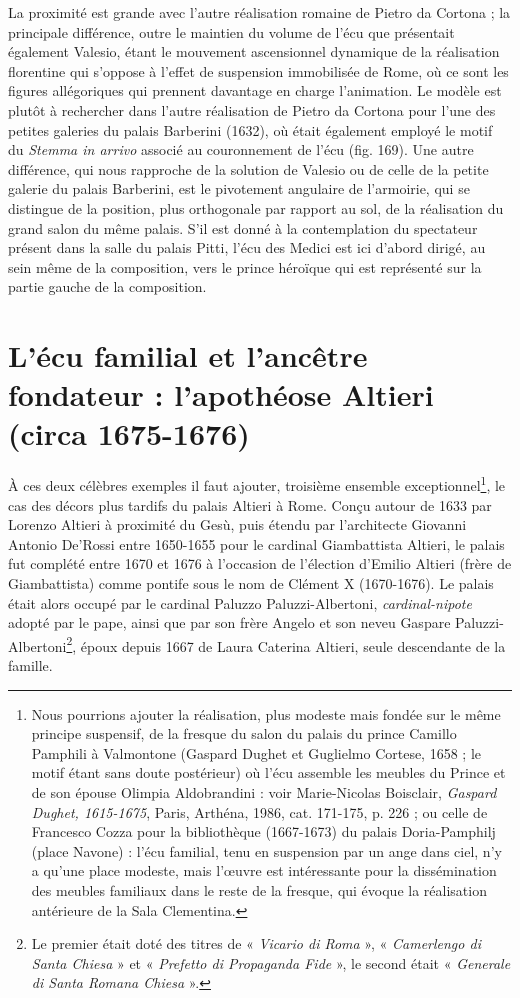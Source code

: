 \documentclass[12pt,twoside,openany]{book}
\begin{document}
La proximité est grande avec l’autre réalisation romaine de Pietro da Cortona ; la principale différence, outre le maintien du volume de l’écu que présentait également Valesio, étant le mouvement ascensionnel dynamique de la réalisation florentine qui s’oppose à l’effet de suspension immobilisée de Rome, où ce sont les figures allégoriques qui prennent davantage en charge l’animation. Le modèle est plutôt à rechercher dans l’autre réalisation de Pietro da Cortona pour l’une des petites galeries du palais Barberini (1632), où était également employé le motif du \textit{Stemma in arrivo} associé au couronnement de l’écu (fig. 169). Une autre différence, qui nous rapproche de la solution de Valesio ou de celle de la petite galerie du palais Barberini, est le pivotement angulaire de l’armoirie, qui se distingue de la position, plus orthogonale par rapport au sol, de la réalisation du grand salon du même palais. S’il est donné à la contemplation du spectateur présent dans la salle du palais Pitti, l’écu des Medici est ici d’abord dirigé, au sein même de la composition, vers le prince héroïque qui est représenté sur la partie gauche de la composition.

\section{L’écu familial et l’ancêtre fondateur : l’apothéose Altieri (circa 1675-1676)}

À ces deux célèbres exemples il faut ajouter, troisième ensemble exceptionnel\footnote{Nous pourrions ajouter la réalisation, plus modeste mais fondée sur le même principe suspensif, de la fresque du salon du palais du prince Camillo Pamphili à Valmontone (Gaspard Dughet et Guglielmo Cortese, 1658 ; le motif étant sans doute postérieur) où l’écu assemble les meubles du Prince et de son épouse Olimpia Aldobrandini : voir Marie-Nicolas Boisclair, \textit{Gaspard Dughet, 1615-1675}, Paris, Arthéna, 1986, cat. 171-175, p. 226 ; ou celle de Francesco Cozza pour la bibliothèque (1667-1673) du palais Doria-Pamphilj (place Navone) : l’écu familial, tenu en suspension par un ange dans ciel, n’y a qu’une place modeste, mais l’œuvre est intéressante pour la dissémination des meubles familiaux dans le reste de la fresque, qui évoque la réalisation antérieure de la Sala Clementina.}, le cas des décors plus tardifs du palais Altieri à Rome. Conçu autour de 1633 par Lorenzo Altieri à proximité du Gesù, puis étendu par l’architecte Giovanni Antonio De’Rossi entre 1650-1655 pour le cardinal Giambattista Altieri, le palais fut complété entre 1670 et 1676 à l’occasion de l’élection d’Emilio Altieri (frère de Giambattista) comme pontife sous le nom de Clément X (1670-1676). Le palais était alors occupé par le cardinal Paluzzo Paluzzi-Albertoni, \textit{cardinal-nipote} adopté par le pape, ainsi que par son frère Angelo et son neveu Gaspare Paluzzi-Albertoni\footnote{Le premier était doté des titres de « \textit{Vicario di Roma} », « \textit{Camerlengo di Santa Chiesa} » et « \textit{Prefetto di Propaganda Fide} », le second était « \textit{Generale di Santa Romana Chiesa} ».}, époux depuis 1667 de Laura Caterina Altieri, seule descendante de la famille.
\end{document}

